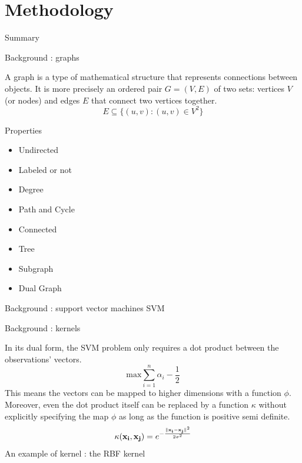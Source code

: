 \documentclass[compress]{beamer}
\DeclarePairedDelimiter{\norm}{\lVert}{\rVert}
\let\vec\mathbf
\begin{document}
\section{Methodology}
\begin{frame}{Summary}
  \tableofcontents[currentsection]
\end{frame}
\begin{frame}{Background : graphs}
\begin{definition}
	A graph\cite{bondy1976graph} is a type of mathematical structure that represents connections between objects. It is more precisely an ordered pair $G=(V,E)$ of two sets: vertices $V$ (or nodes) and edges $E$ that connect two vertices together.
	\begin{equation*}
	E \subseteq \{(u,v) : (u,v) \in V^2\}
	\end{equation*}
\end{definition}
\begin{block}{Properties}
	\begin{multicols}{2}
		\begin{itemize}
			\item Undirected
			\item Labeled or not
			\item Degree
			\item Path and Cycle
		\end{itemize}
		\begin{itemize}
			\item Connected
			\item Tree
			\item Subgraph
			\item Dual Graph
		\end{itemize}
	\end{multicols}
\end{block}
\end{frame}
\begin{frame}{Background : support vector machines}
	SVM
\end{frame}
\begin{frame}{Background : kernels}
	\begin{definition}
		In its dual form, the SVM problem only requires a dot product between the observations' vectors. 
		\begin{equation*}
		\text{max} \sum\limits_{i=1}^{n} \alpha_i - \frac{1}{2} 
		\end{equation*}
		This means the vectors can be mapped to higher dimensions with a function $\phi$. Moreover, even the dot product itself can be replaced by a function $\kappa$ without explicitly specifying the map $\phi$ as long as the function is positive semi definite.
		\begin{equation*}
		\kappa(\vec{x_{i}},\vec{x_{j}})={e}^{-\frac{\norm{\vec{x_{i}}-\vec{x_{j}}}^{2}}{2\sigma^{2}}}
		\end{equation*}
		\centering
		An example of kernel : the RBF kernel
	\end{definition}
\end{frame}
\end{document}
